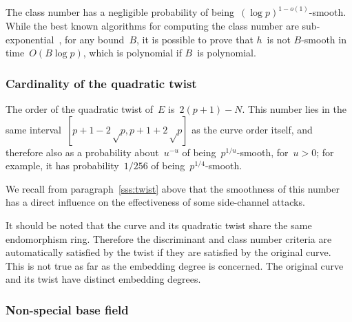 \documentclass[twocolumn,letterpaper,10pt]{article}
\DeclareMathOperator\Cl{Cl}
\begin{document}
\medbreak

The class number has a negligible probability
of being~$(\log p)^{1-o(1)}$-smooth.
While the best known algorithms for computing the class number
are sub-exponential~\cite{ams1989hmc,amc2010biasse},
for any bound~$B$,
it is possible to prove that $h$~is not $B$-smooth
in time~$O(B \log p)$,
which is polynomial if $B$~is polynomial.


\subsubsection{Cardinality of the quadratic twist}
\label{sss:normal-twist}

The order of the quadratic twist of~$E$ is~$2(p+1) - N$.
This number lies in the same interval~$[p+1-2√p, p+1+2√p]$
as the curve order itself,
and therefore also as a probability about~$u^{-u}$
of being~$p^{1/u}$-smooth, for~$u > 0$;
for example, it has probability~$1/256$ of being~$p^{1/4}$-smooth.

We recall from paragraph~\ref{sss:twist} above
that the smoothness of this number has a direct influence
on the effectiveness of some side-channel attacks.

It should be noted that the curve and its quadratic twist
share the same endomorphism ring.
Therefore the discriminant and class number criteria
are automatically satisfied by the twist
if they are satisfied by the original curve.
This is not true as far as the embedding degree is concerned.
The original curve and its twist have distinct embedding degrees.

\subsubsection{Non-special base field}
\label{sss:special-anormal}
\end{document}
